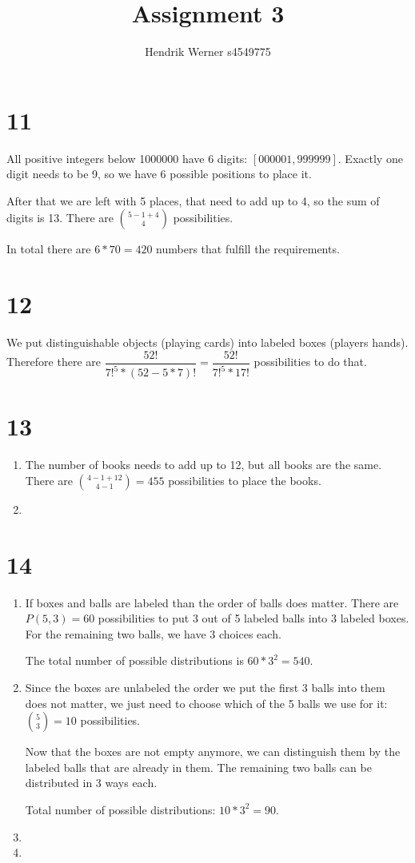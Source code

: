 \documentclass[12pt]{article}
\title{Assignment 3}
\author{
	Hendrik Werner s4549775
}
\begin{document}
\maketitle

\section*{11}
All positive integers below 1000000 have 6 digits: $[000001, 999999]$. Exactly one digit needs to be 9, so we have 6 possible positions to place it.

After that we are left with 5 places, that need to add up to 4, so the sum of digits is 13. There are $\binom{5 - 1 + 4}{4}$ possibilities.

In total there are $6 * 70 = 420$ numbers that fulfill the requirements.

\section*{12}
We put distinguishable objects (playing cards) into labeled boxes (players hands). Therefore there are $\dfrac{52!}{7!^5 * (52 - 5 * 7)!} =  \dfrac{52!}{7!^5 * 17!}$ possibilities to do that.

\section*{13}
\begin{enumerate}[a]
	\item %
	The number of books needs to add up to 12, but all books are the same. There are $\binom{4 - 1 + 12}{4 - 1} = 455$ possibilities to place the books.

	\item %
\end{enumerate}

\section*{14}
\begin{enumerate}[a]
	\item %
	If boxes and balls are labeled than the order of balls does matter. There are $P(5, 3) = 60$ possibilities to put 3 out of 5 labeled balls into 3 labeled boxes. For the remaining two balls, we have 3 choices each.

	The total number of possible distributions is $60 * 3^2 = 540$.

	\item %
	Since the boxes are unlabeled the order we put the first 3 balls into them does not matter, we just need to choose which of the 5 balls we use for it: $\binom{5}{3} = 10$ possibilities.

	Now that the boxes are not empty anymore, we can distinguish them by the labeled balls that are already in them. The remaining two balls can be distributed in 3 ways each.

	Total number of possible distributions: $10 * 3^2 = 90$.
	\item %
	\item %
\end{enumerate}
\end{document}
